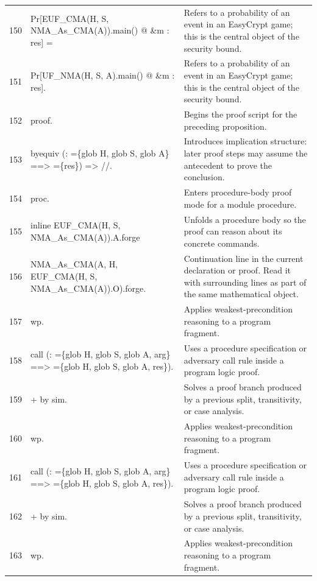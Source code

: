 \documentclass[10pt]{article}
\begin{document}
\begin{longtable}{r L{0.53\textwidth} L{0.37\textwidth}}
150 & {\ttfamily\scriptsize   Pr[EUF\_CMA(H, S, NMA\_As\_CMA(A)).main() @ \&m : res] =} & Refers to a probability of an event in an EasyCrypt game; this is the central object of the security bound. \\
151 & {\ttfamily\scriptsize   Pr[UF\_NMA(H, S, A).main() @ \&m : res].} & Refers to a probability of an event in an EasyCrypt game; this is the central object of the security bound. \\
152 & {\ttfamily\scriptsize proof.} & Begins the proof script for the preceding proposition. \\
153 & {\ttfamily\scriptsize byequiv (: =\{glob H, glob S, glob A\} ==> =\{res\}) => //.} & Introduces implication structure: later proof steps may assume the antecedent to prove the conclusion. \\
154 & {\ttfamily\scriptsize proc.} & Enters procedure-body proof mode for a module procedure. \\
155 & {\ttfamily\scriptsize inline EUF\_CMA(H, S, NMA\_As\_CMA(A)).A.forge} & Unfolds a procedure body so the proof can reason about its concrete commands. \\
156 & {\ttfamily\scriptsize        NMA\_As\_CMA(A, H, EUF\_CMA(H, S, NMA\_As\_CMA(A)).O).forge.} & Continuation line in the current declaration or proof.  Read it with surrounding lines as part of the same mathematical object. \\
157 & {\ttfamily\scriptsize wp.} & Applies weakest-precondition reasoning to a program fragment. \\
158 & {\ttfamily\scriptsize call (: =\{glob H, glob S, glob A, arg\} ==> =\{glob H, glob S, glob A, res\}).} & Uses a procedure specification or adversary call rule inside a program logic proof. \\
159 & {\ttfamily\scriptsize + by sim.} & Solves a proof branch produced by a previous split, transitivity, or case analysis. \\
160 & {\ttfamily\scriptsize wp.} & Applies weakest-precondition reasoning to a program fragment. \\
161 & {\ttfamily\scriptsize call (: =\{glob H, glob S, glob A, arg\} ==> =\{glob H, glob S, glob A, res\}).} & Uses a procedure specification or adversary call rule inside a program logic proof. \\
162 & {\ttfamily\scriptsize + by sim.} & Solves a proof branch produced by a previous split, transitivity, or case analysis. \\
163 & {\ttfamily\scriptsize wp.} & Applies weakest-precondition reasoning to a program fragment. \\

\end{longtable}
\end{document}
